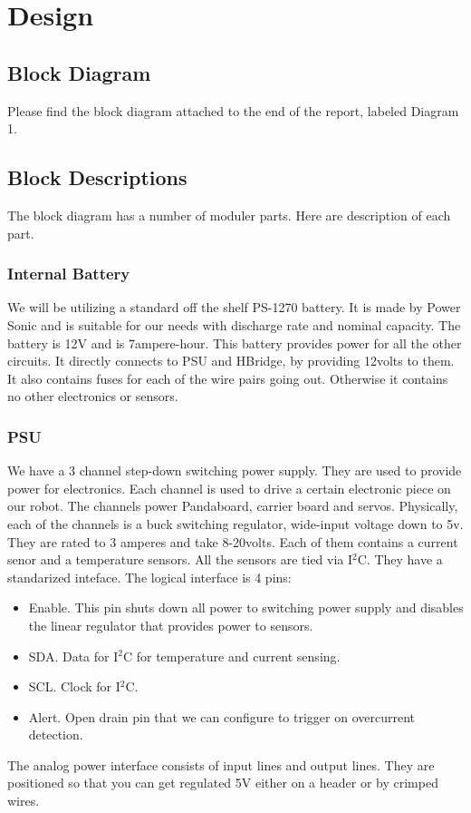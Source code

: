\documentclass[12pt]{article}
\begin{document}
 \section{Design}
 \subsection{Block Diagram}
 Please find the block diagram attached to the end of the report, labeled Diagram 1.
 \subsection{Block Descriptions} The block diagram has a number of moduler parts. Here are description of each part.

 \subsubsection{Internal Battery} We will be utilizing a standard off the shelf PS-1270 battery. It is made by Power Sonic and is suitable for our needs with discharge rate and nominal capacity. The battery is 12V and is 7ampere-hour. This battery provides power for all the other circuits. It directly connects to PSU and HBridge, by providing 12volts to them. It also contains fuses for each of the wire pairs going out. Otherwise it contains no other electronics or sensors.
 \subsubsection{PSU} We have a 3 channel step-down switching power supply. They are used to provide power for electronics. Each channel is used to drive a certain electronic piece on our robot. The channels power Pandaboard, carrier board and servos. Physically, each of the channels is a buck switching regulator, wide-input voltage down to 5v. They are rated to 3 amperes and take 8-20volts.  Each of them contains a current senor and a temperature sensors. All the sensors are tied via I$^{\textrm{2}}$C. They have a standarized inteface. The logical interface is 4 pins:
 \begin{itemize} 
   \item Enable. This pin shuts down all power to switching power supply and disables the linear regulator that provides power to sensors. 
   \item SDA. Data for I$^{\textrm{2}}$C for temperature and current sensing.
   \item SCL. Clock for I$^{\textrm{2}}$C.
   \item Alert. Open drain pin that we can configure to trigger on overcurrent detection.
 \end{itemize} The analog power interface consists of input lines and output lines. They are positioned so that you can get regulated 5V either on a header or by crimped wires.
\end{document}
